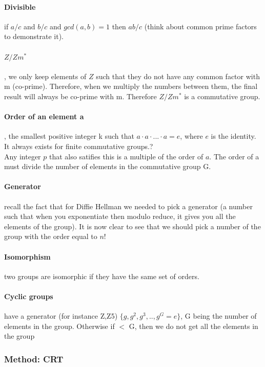 \documentclass{article}
\begin{document}
\paragraph{Divisible} if $a/c$ and $b/c$ and $gcd(a, b) = 1$ then $ab/c$ (think about common prime factors to demonstrate it).

\paragraph{$Z/Zm^*$}, we only keep elements of $ Z $ such that they do not have any common factor with m (co-prime). Therefore, when we multiply the numbers between them, the final result will always be co-prime with m. Therefore $Z/Zm^*$ is a commutative group.

\paragraph{Order of an element a}, the smallest positive integer k such that $ a \cdot a \cdot ... \cdot a  = e $, where $ e $ is the identity. It always exists for finite commutative groups.?\\
Any integer $p$ that also satifies this is a multiple of the order of $a$. The order of a must divide the number of elements in the commutative group G.

\paragraph{Generator} recall the fact that for Diffie Hellman we needed to pick a generator (a number such that when you exponentiate then modulo reduce, it gives you all the elements of the group). It is now clear to see that we should pick a number of the group with the order equal to $n$!

\paragraph{Isomorphism} two groups are isomorphic if they have the same set of orders.

\paragraph{Cyclic groups} have a generator (for instance Z,Z5)
$\{ g, g^2, g^3, .., g^G = e \}$, G being the number of elements in the group. Otherwise if $ < $ G, then we do not get all the elements in the group

\subsubsection{Method: CRT}
\end{document}
